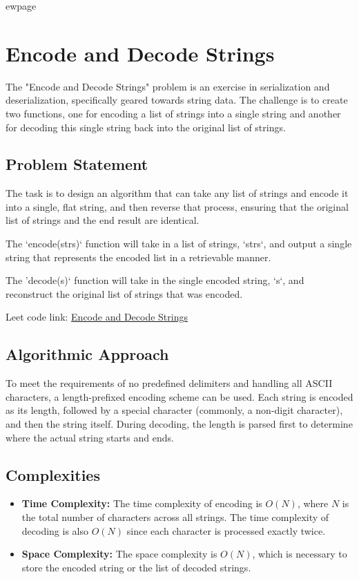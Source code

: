 
ewpage

\chapter{Encode and Decode Strings}
\label{chap:encode_decode_strings}

The "Encode and Decode Strings" problem is an exercise in serialization and deserialization, specifically geared towards string data. The challenge is to create two functions, one for encoding a list of strings into a single string and another for decoding this single string back into the original list of strings.

\section*{Problem Statement}
The task is to design an algorithm that can take any list of strings and encode it into a single, flat string, and then reverse that process, ensuring that the original list of strings and the end result are identical. 

The `encode(strs)` function will take in a list of strings, `strs`, and output a single string that represents the encoded list in a retrievable manner.

The 'decode(s)` function will take in the single encoded string, `s`, and reconstruct the original list of strings that was encoded.

Leet code link: \href{https://leetcode.com/problems/encode-and-decode-strings/}{Encode and Decode Strings}

\section*{Algorithmic Approach}
To meet the requirements of no predefined delimiters and handling all ASCII characters, a length-prefixed encoding scheme can be used. Each string is encoded as its length, followed by a special character (commonly, a non-digit character), and then the string itself. During decoding, the length is parsed first to determine where the actual string starts and ends.

\section*{Complexities}
\begin{itemize}
	\item \textbf{Time Complexity:} The time complexity of encoding is \(O(N)\), where \(N\) is the total number of characters across all strings. The time complexity of decoding is also \(O(N)\) since each character is processed exactly twice.
	\item \textbf{Space Complexity:} The space complexity is \(O(N)\), which is necessary to store the encoded string or the list of decoded strings.
\end{itemize}


